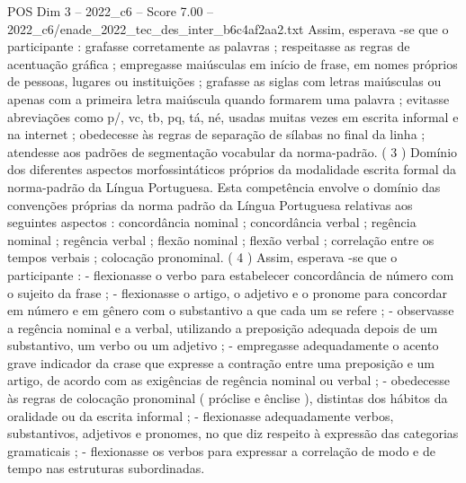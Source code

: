\begin{textsample}{POS Dim 3 – 2022\_c6 – Score 7.00 – 2022\_c6/enade\_2022\_tec\_des\_inter\_b6c4af2aa2.txt}
Assim, esperava -se que o participante : grafasse corretamente as palavras ; respeitasse as regras de acentuação gráfica ; empregasse maiúsculas em início de frase, em nomes próprios de pessoas, lugares ou instituições ; grafasse as siglas com letras maiúsculas ou apenas com a primeira letra maiúscula quando formarem uma palavra ; evitasse abreviações como p/, vc, tb, pq, tá, né, usadas muitas vezes em escrita informal e na internet ; obedecesse às regras de separação de sílabas no final da linha ; atendesse aos padrões de segmentação vocabular da norma-padrão. ( 3 ) Domínio dos diferentes aspectos morfossintáticos próprios da modalidade escrita formal da norma-padrão da Língua Portuguesa.
Esta competência envolve o domínio das convenções próprias da norma padrão da Língua Portuguesa relativas aos seguintes aspectos : concordância nominal ; concordância verbal ; regência nominal ; regência verbal ; flexão nominal ; flexão verbal ; correlação entre os tempos verbais ; colocação pronominal. ( 4 ) Assim, esperava -se que o participante : - flexionasse o verbo para estabelecer concordância de número com o sujeito da frase ; - flexionasse o artigo, o adjetivo e o pronome para concordar em número e em gênero com o substantivo a que cada um se refere ; - observasse a regência nominal e a verbal, utilizando a preposição adequada depois de um substantivo, um verbo ou um adjetivo ; - empregasse adequadamente o acento grave indicador da crase que expresse a contração entre uma preposição e um artigo, de acordo com as exigências de regência nominal ou verbal ; - obedecesse às regras de colocação pronominal ( próclise e ênclise ), distintas dos hábitos da oralidade ou da escrita informal ; - flexionasse adequadamente verbos, substantivos, adjetivos e pronomes, no que diz respeito à expressão das categorias gramaticais ; - flexionasse os verbos para expressar a correlação de modo e de tempo nas estruturas subordinadas.

\end{textsample}
